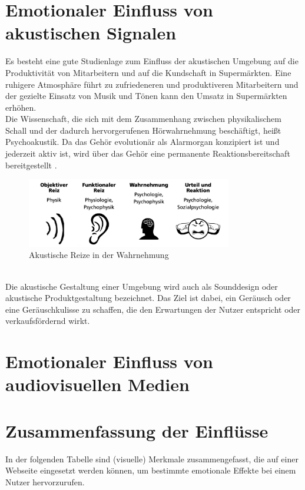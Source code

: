 \documentclass[./dokumentation.tex]{subfiles}
\begin{document}
\section{Emotionaler Einfluss von akustischen Signalen}
Es besteht eine gute Studienlage zum Einfluss der akustischen Umgebung auf die Produktivität von Mitarbeitern und auf die Kundschaft in Supermärkten. Eine ruhigere Atmosphäre führt zu zufriedeneren und produktiveren Mitarbeitern und der gezielte Einsatz von Musik und Tönen kann den Umsatz in Supermärkten erhöhen. \\
Die Wissenschaft, die sich mit dem Zusammenhang zwischen physikalischem Schall und der dadurch hervorgerufenen Hörwahrnehmung beschäftigt, heißt Psychoakustik. Da das Gehör evolutionär als Alarmorgan konzipiert ist und jederzeit aktiv ist, wird über das Gehör eine permanente Reaktionsbereitschaft bereitgestellt \cite{fraunhofer}.\\

\begin{figure}[h]
    \centering
    \includegraphics[width=0.8\textwidth]{bilder/fraunhofer_akustik.png}
    \caption{Akustische Reize in der Wahrnehmung \cite{fraunhofer}}
    \label{fig10:fraunhofer}
\end{figure}\\

Die akustische Gestaltung einer Umgebung wird auch als Sounddesign oder akustische Produktgestaltung bezeichnet. Das Ziel ist dabei, ein Geräusch oder eine Geräuschkulisse zu schaffen, die den Erwartungen der Nutzer entspricht oder verkaufsfördernd wirkt. \\

\section{Emotionaler Einfluss von audiovisuellen Medien} %

\section{Zusammenfassung der Einflüsse} %
In der folgenden Tabelle sind (visuelle) Merkmale zusammengefasst, die auf einer Webseite eingesetzt werden können, um bestimmte emotionale Effekte bei einem Nutzer hervorzurufen. \\
\end{document}
